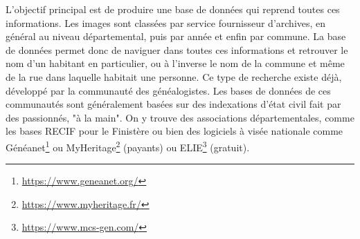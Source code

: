 L’objectif principal est de produire une base de données qui reprend toutes ces informations. Les images sont classées par service fournisseur d'archives, en général au niveau départemental, puis par année et enfin par commune. La base de données permet donc de naviguer dans toutes ces informations et retrouver le nom d’un habitant en particulier, ou à l’inverse le nom de la commune et même de la rue dans laquelle habitait une personne. Ce type de recherche existe déjà, développé par la communauté des généalogistes. Les bases de données de ces communautés sont généralement basées sur des indexations d’état civil fait par des passionnés, "à la main". On y trouve des associations départementales, comme les bases RECIF pour le Finistère ou bien des logiciels à visée nationale comme Généanet\footnote{\href{https://www.geneanet.org/}{https://www.geneanet.org/}} ou MyHeritage\footnote{\href{https://www.myheritage.fr/}{https://www.myheritage.fr/}} (payants) ou ELIE\footnote{\href{https://www.mcs-gen.com/}{https://www.mcs-gen.com/}} (gratuit).\\

